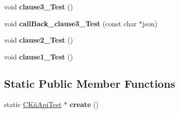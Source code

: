 \begin{DoxyCompactItemize}
\item 
\hypertarget{class_c_kii_api_test_a1cebe9d4d674011fcd59f3522df58f00}{void {\bfseries clause3\-\_\-\-Test} ()}\label{class_c_kii_api_test_a1cebe9d4d674011fcd59f3522df58f00}

\item 
\hypertarget{class_c_kii_api_test_a0f46406be2c5f5a5833d1cd0d03941ed}{void {\bfseries call\-Back\-\_\-clause3\-\_\-\-Test} (const char $\ast$json)}\label{class_c_kii_api_test_a0f46406be2c5f5a5833d1cd0d03941ed}

\item 
\hypertarget{class_c_kii_api_test_a73704e8e2cc595ae16d1adb6ac1af58d}{void {\bfseries clause2\-\_\-\-Test} ()}\label{class_c_kii_api_test_a73704e8e2cc595ae16d1adb6ac1af58d}

\item 
\hypertarget{class_c_kii_api_test_a25975e0e88911b24fff04696035da7b1}{void {\bfseries clause1\-\_\-\-Test} ()}\label{class_c_kii_api_test_a25975e0e88911b24fff04696035da7b1}

\end{DoxyCompactItemize}
\subsection*{Static Public Member Functions}
\begin{DoxyCompactItemize}
\item 
\hypertarget{class_c_kii_api_test_aa4017a64bbd9c903c257c638d8291ee6}{static \hyperlink{class_c_kii_api_test}{C\-Kii\-Api\-Test} $\ast$ {\bfseries create} ()}\label{class_c_kii_api_test_aa4017a64bbd9c903c257c638d8291ee6}

\end{DoxyCompactItemize}
